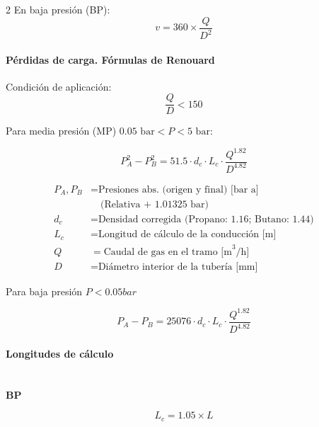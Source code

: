 \documentclass[11pt]{article}
\begin{document}
\begin{multicols*}{2}
    En baja presión (BP):
    \begin{equation*}
        v = 360 \times \frac{Q}{D^2}
    \end{equation*}

    \paragraph{Pérdidas de carga. Fórmulas de Renouard}
    
    Condición de aplicación:
    \begin{equation*}
        \frac{Q}{D} < 150 
    \end{equation*}

    Para media presión (MP) $0.05 \text{ bar} < P < 5 \text{ bar}$:

    \begin{equation*}
        P_A^2 - P_B^2 = 51.5 \cdot d_c \cdot L_c \cdot \frac{Q^{1.82}}{D^{4.82}}
    \end{equation*}

    \begin{minipage}{\linewidth}
        \begin{align*}
            P_A, P_B &= \text{Presiones abs. (origen y final) [bar a]} \\
            &\quad \text{(Relativa + 1.01325 bar)} \\
            d_c &= \text{Densidad corregida (Propano: 1.16; Butano: 1.44)} \\
            L_c &= \text{Longitud de cálculo de la conducción [m]} \\
            Q &= \text{Caudal de gas en el tramo [m}^3\text{/h]} \\
            D &= \text{Diámetro interior de la tubería [mm]}
        \end{align*}
    \end{minipage}

    Para baja presión $P < 0.05 bar$

    \begin{equation*}
        P_A - P_B = 25076 \cdot d_c \cdot L_c \cdot \frac{Q^{1.82}}{D^{4.82}}
    \end{equation*}

    \paragraph{Longitudes de cálculo}\mbox{}\\
    \textbf{BP}

    \begin{equation*}
        L_c = 1.05 \times L    
    \end{equation*}


\end{multicols*}
\end{document}

